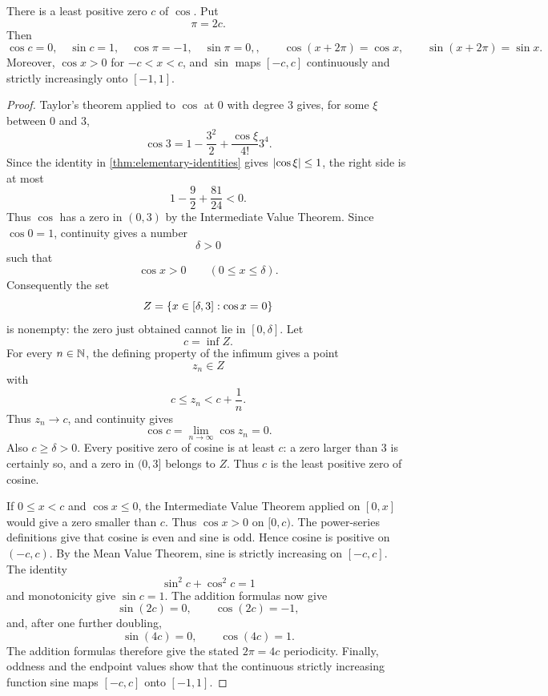 \begin{theorem}
\label{thm:pi-construction}
There is a least positive zero $c$ of $\cos$. Put
\[
\pi=2c.
\]
Then
\[
\cos c=0,\quad \sin c=1,\quad \cos\pi=-1,\quad\sin\pi=0,,\qquad \cos(x+2\pi)=\cos x,\qquad\sin(x+2\pi)=\sin x.
\]
Moreover, $\cos x>0$ for $-c<x<c$, and $\sin$ maps $[-c,c]$ continuously and strictly increasingly onto $[-1,1]$.
\end{theorem}
\begin{proof}
Taylor's theorem applied to $\cos$ at $0$ with degree $3$ gives, for some $\xi$ between $0$ and $3$,
\[
\cos3=1-\frac{3^2}{2}+\frac{\cos\xi}{4!}3^4.
\]
Since the identity in \cref{thm:elementary-identities} gives $\lvert \cos\xi\rvert\leq1$, the right side is at most
\[
1-\frac92+\frac{81}{24}<0.
\]
Thus $\cos$ has a zero in $(0,3)$ by the Intermediate Value Theorem. Since $\cos0=1$, continuity gives a number
\[
\delta>0
\]
such that
\[
\cos x>0
\qquad(0\leq x\leq\delta).
\]
Consequently the set
\[
Z=\left\{x\in[\delta,3]:\cos x=0\right\}
\]
is nonempty: the zero just obtained cannot lie in $[0,\delta]$. Let
\[
c=\inf Z.
\]
For every $n\in\mathbb{N}$, the defining property of the infimum gives a point
\[
z_n\in Z
\]
with
\[
c\leq z_n<c+\frac1n.
\]
Thus $z_n\to c$, and continuity gives
\[
\cos c=\lim_{n\to\infty}\cos z_n=0.
\]
Also $c\geq\delta>0$. Every positive zero of cosine is at least $c$: a zero larger than $3$ is certainly so, and a zero in $(0,3]$ belongs to $Z$. Thus $c$ is the least positive zero of cosine.

If $0\leq x<c$ and $\cos x\leq0$, the Intermediate Value Theorem applied on $[0,x]$ would give a zero smaller than $c$. Thus $\cos x>0$ on $[0,c)$. The power-series definitions give that cosine is even and sine is odd. Hence cosine is positive on $(-c,c)$. By the Mean Value Theorem, sine is strictly increasing on $[-c,c]$. The identity
\[
\sin^2c+\cos^2c=1
\]
and monotonicity give $\sin c=1$. The addition formulas now give
\[
\sin(2c)=0,\qquad\cos(2c)=-1,
\]
and, after one further doubling,
\[
\sin(4c)=0,\qquad\cos(4c)=1.
\]
The addition formulas therefore give the stated $2\pi=4c$ periodicity. Finally, oddness and the endpoint values show that the continuous strictly increasing function sine maps $[-c,c]$ onto $[-1,1]$.
\end{proof}


